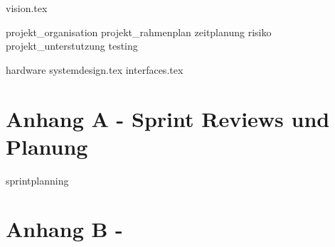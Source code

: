 \documentclass[a4paper, 10pt, fleqn]{article}
\begin{document}
	\begin{titlepage}
		\titleGM
		\thispagestyle{empty}
	\end{titlepage}
	
    
	\tableofcontents
	
    \clearpage
    
	\clearpage
	
    
    {vision.tex}
    
    {projekt_organisation}
    \clearpage
    {projekt_rahmenplan}
    \clearpage
    {zeitplanung}
    \clearpage
    {risiko}
    \clearpage
    {projekt_unterstutzung}
    \clearpage
    {testing}
    
    {hardware}
    \clearpage
	{systemdesign.tex}
    \clearpage
    {interfaces.tex}
    
    \clearpage
    
    
    \clearpage
    \nocite{*}
    
    
    
    \clearpage
    \listoffigures
    \listoftables
    
    \clearpage
   	\section*{Anhang A - Sprint Reviews und Planung}
    {sprintplanning}
    
    \clearpage
    \section*{Anhang B -}
\end{document}
